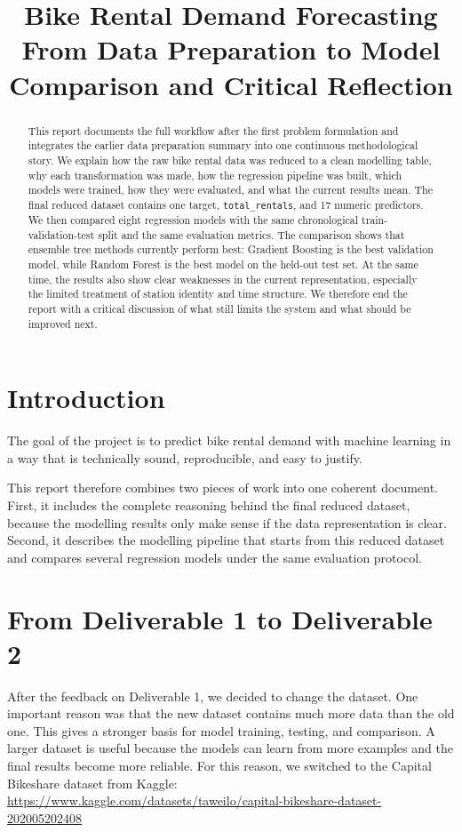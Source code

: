 \documentclass[conference]{IEEEtran}
\title{Bike Rental Demand Forecasting\\From Data Preparation to Model Comparison and Critical Reflection}
\author{
\IEEEauthorblockN{Anton Wilhelmi and Alexander Harant}
\IEEEauthorblockA{Introduction to Machine Learning\\
Group Project - Deliverable 2}
}
\begin{document}
\maketitle

\begin{abstract}
This report documents the full workflow after the first problem formulation and integrates the earlier data preparation summary into one continuous methodological story. We explain how the raw bike rental data was reduced to a clean modelling table, why each transformation was made, how the regression pipeline was built, which models were trained, how they were evaluated, and what the current results mean. The final reduced dataset contains one target, \texttt{total\_rentals}, and 17 numeric predictors. We then compared eight regression models with the same chronological train-validation-test split and the same evaluation metrics. The comparison shows that ensemble tree methods currently perform best: Gradient Boosting is the best validation model, while Random Forest is the best model on the held-out test set. At the same time, the results also show clear weaknesses in the current representation, especially the limited treatment of station identity and time structure. We therefore end the report with a critical discussion of what still limits the system and what should be improved next.
\end{abstract}

\section{Introduction}
The goal of the project is to predict bike rental demand with machine learning in a way that is 
technically sound, reproducible, and easy to justify.

This report therefore combines two pieces of work into one coherent document. First, it includes 
the complete reasoning behind the final reduced dataset, because the modelling results only make 
sense if the data representation is clear. Second, it describes the modelling pipeline that starts 
from this reduced dataset and compares several regression models under the same evaluation protocol.

\section{From Deliverable 1 to Deliverable 2}
After the feedback on Deliverable 1, we decided to change the dataset. One important reason was that 
the new dataset contains much more data than the old one. This gives a stronger basis for model training, 
testing, and comparison. A larger dataset is useful because the models can learn from more examples and 
the final results become more reliable. For this reason, we switched to the Capital Bikeshare dataset 
from Kaggle:
\url{https://www.kaggle.com/datasets/taweilo/capital-bikeshare-dataset-202005202408}
\end{document}
